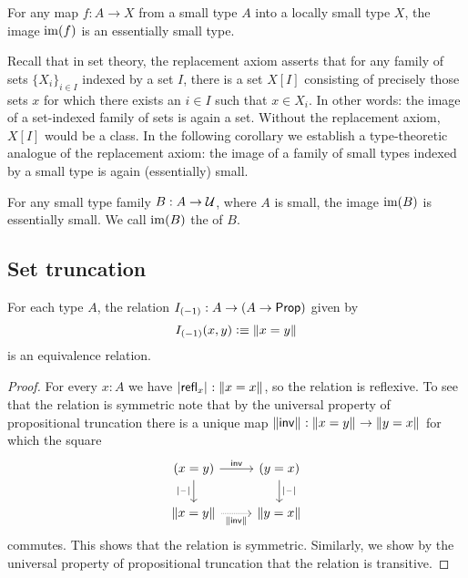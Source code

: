\begin{thm}
For any map $f:A\to X$ from a small type $A$ into a locally small type $X$, the image $\operatorname{im}(f)$ is an essentially small type.
\end{thm}

Recall that in set theory, the replacement axiom asserts that for any family of sets $\{X_i\}_{i\in I}$ indexed by a set $I$, there is a set $X[I]$ consisting of precisely those sets $x$ for which there exists an $i\in I$ such that $x\in X_i$. In other words: the image of a set-indexed family of sets is again a set. Without the replacement axiom, $X[I]$ would be a class. In the following corollary we establish a type-theoretic analogue of the replacement axiom: the image of a family of small types indexed by a small type is again (essentially) small.

\begin{cor}\label{cor:im_small}
For any small type family $B:A\to\mathcal{U}$, where $A$ is small, the image $\operatorname{im}(B)$ is essentially small. We call $\operatorname{im}(B)$ the  of $B$. 
\end{cor}

\subsection{Set truncation}

\begin{lem}
For each type $A$, the relation $I_{(-1)}:A\to (A\to\mathsf{Prop})$ given by
\begin{equation*}
I_{(-1)}(x,y)\vcentcolon\equiv\Vert x=y\Vert_{}
\end{equation*}
is an equivalence relation.
\end{lem}

\begin{proof}
For every $x:A$ we have $\mathopen{}\left|\mathsf{refl}_{x}\right|_{}^{}\mathclose{}:\Vert x=x\Vert_{}$, so the relation is reflexive. To see that the relation is symmetric note that by the universal property of propositional truncation there is a unique map $\Vert \mathsf{inv}\Vert_{}:\Vert x=y\Vert_{}\to\Vert y=x\Vert_{}$ for which the square
\begin{equation*}
\begin{tikzcd}
(x=y) \arrow[r,"\invfunc"] \arrow[d,swap,"\bproj{\blank}"] & (y=x) \arrow[d,"\bproj{\blank}"] \\
\brck{x=y} \arrow[r,densely dotted,swap,"\brck{\invfunc}"] & \brck{y=x}
\end{tikzcd}
\end{equation*}
commutes. This shows that the relation is symmetric. Similarly, we show by the universal property of propositional truncation that the relation is transitive.
\end{proof}

